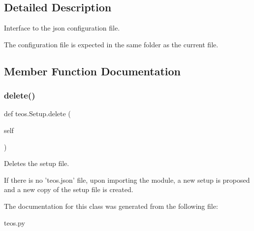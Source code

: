 \subsection{Detailed Description}
\begin{DoxyVerb}Interface to the json configuration file.

The configuration file is expected in the same folder as the current file.
\end{DoxyVerb}
 

\subsection{Member Function Documentation}
\mbox{\label{classteos_1_1Setup_a34c784372e90531c81a21a8a003b6ce8}} 
\subsubsection{\texorpdfstring{delete()}{delete()}}
{\footnotesize\ttfamily def teos.\+Setup.\+delete (\begin{DoxyParamCaption}\item[{}]{self }\end{DoxyParamCaption})}

\begin{DoxyVerb}Deletes the setup file.

If there is no 'teos.json' file, upon importing the module, a new 
setup is proposed and a new copy of the setup file is created. 
\end{DoxyVerb}
 

The documentation for this class was generated from the following file\+:\begin{DoxyCompactItemize}
\item 
teos.\+py\end{DoxyCompactItemize}

